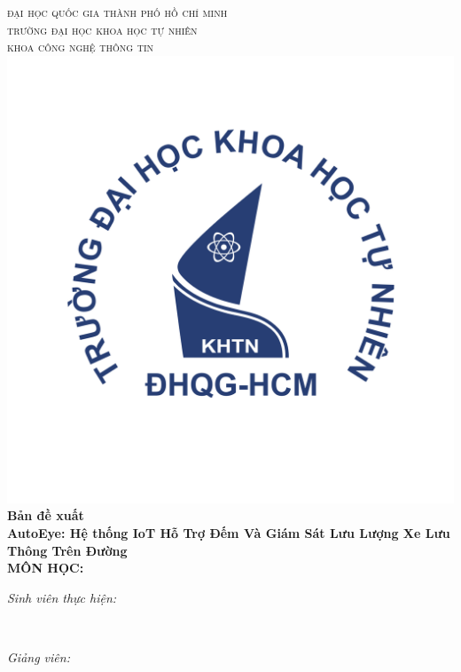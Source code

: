 \begin{titlepage}
\newcommand{\HRule}{\rule{\linewidth}{0.5mm}}
\centering

\textsc{\LARGE đại học quốc gia thành phố hồ chí minh}\\[0.2cm]
\textsc{\LARGE trường đại học khoa học tự nhiên}\\[0.3cm]
\textsc{\Large khoa công nghệ thông tin}\\[0.5cm]

\includegraphics[scale=.35]{image/hcmus-logo.png}\\[0.5cm]

\huge{\bfseries{Bản đề xuất \\ AutoEye: Hệ thống IoT Hỗ Trợ Đếm Và Giám Sát Lưu Lượng Xe Lưu Thông Trên Đường}}\\
\textbf{\large MÔN HỌC: \coursetitle}\\[0.5cm]

\begin{minipage}[t]{0.5\textwidth}
\begin{flushleft} \large
\emph{Sinh viên thực hiện:}\\
\studentname
\end{flushleft}
\end{minipage}
~
\begin{minipage}[t]{0.4\textwidth}
\begin{flushright} \large
\emph{Giảng viên:} \\
\teachername
\end{flushright}
\end{minipage}\\[4cm]



\vfill
\end{titlepage}
	